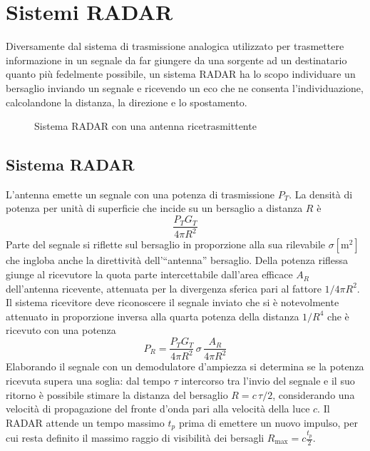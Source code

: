 \chapter{Sistemi \ac{RADAR}}
Diversamente dal sistema di trasmissione analogica utilizzato per trasmettere informazione in un segnale da far giungere da una sorgente ad un destinatario quanto più fedelmente possibile, un sistema \acf{RADAR} ha lo scopo individuare un bersaglio inviando un segnale e ricevendo un eco che ne consenta l'individuazione, calcolandone la distanza, la direzione e lo spostamento.

\begin{figure}[ht]\centering
	\caption{Sistema \ac{RADAR} con una antenna ricetrasmittente}
	\label{fig:radar_tx_rx}
\end{figure}

\section{Sistema RADAR}
L'antenna emette un segnale con una potenza di trasmissione $P_T$. La densità di potenza per unità di superficie che incide su un bersaglio a distanza $R$ è
\begin{equation}
\frac{P_T G_T}{4\pi R^2}
\end{equation}
Parte del segnale si riflette sul bersaglio in proporzione alla sua  rilevabile $\sigma [\si{\square\meter}]$ che ingloba anche la direttività dell'“antenna” bersaglio. Della potenza riflessa giunge al ricevutore la quota parte intercettabile dall'area efficace $A_R$ dell'antenna ricevente, attenuata per la divergenza sferica pari al fattore $1/4\pi R^2$. Il sistema ricevitore deve riconoscere il segnale inviato che si è notevolmente attenuato in proporzione inversa alla quarta potenza della distanza $1/R^4$ che è ricevuto con una potenza
\begin{equation}
P_R = \frac{P_T G_T}{4\pi R^2}\,\sigma\,\frac{A_R}{4\pi R^2}
\end{equation}
Elaborando il segnale con un demodulatore d'ampiezza si determina se la potenza ricevuta supera una soglia: dal tempo  $\tau$ intercorso tra l'invio del segnale e il suo ritorno è possibile stimare la distanza del bersaglio $R=c\,\tau/2$, considerando una velocità di propagazione del fronte d'onda pari alla velocità della luce $c$. Il \ac{RADAR} attende un tempo massimo $t_p$ prima di emettere un nuovo impulso, per cui resta definito il massimo raggio di visibilità dei bersagli $R_\text{max}=c\frac{t_p}{2}$.

